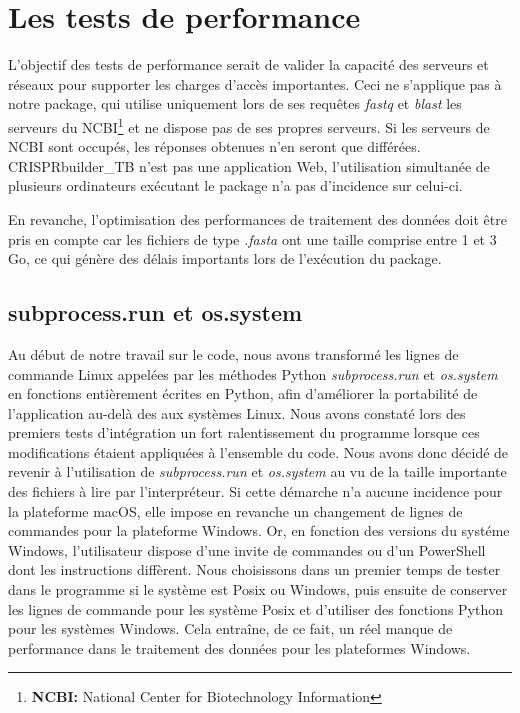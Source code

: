 \documentclass[twoside,a4paper,11pt,frenchb,openany]{report}
\begin{document}
\section{Les tests de performance}

L'objectif des tests de performance serait de valider la capacité des serveurs et réseaux pour supporter les charges d'accès importantes. Ceci ne s'applique pas à notre package, qui utilise uniquement lors de ses requêtes \textit{fastq} et \textit{blast} les serveurs du NCBI\footnote{\textbf{NCBI:} National Center for Biotechnology Information} et ne dispose pas de ses propres serveurs. Si les serveurs de NCBI sont occupés, les réponses obtenues n'en seront que différées. CRISPRbuilder\_TB n'est pas une application Web, l'utilisation simultanée de plusieurs ordinateurs exécutant le package n'a pas d'incidence sur celui-ci.

En revanche, l'optimisation des performances de traitement des données doit être pris en compte car les fichiers de type \textit{.fasta} ont une taille comprise entre 1 et 3 Go, ce qui génère des délais importants lors de l'exécution du package.



\subsection{subprocess.run et os.system}

Au début de notre travail sur le code, nous avons transformé les lignes de commande Linux appelées par les méthodes Python \textit{subprocess.run} et \textit{os.system} en fonctions entièrement écrites en Python, afin d'améliorer la portabilité de l'application au-delà des aux systèmes Linux. Nous avons constaté lors des premiers tests d'intégration un fort ralentissement du programme lorsque ces modifications étaient appliquées à l'ensemble du code. Nous avons donc décidé de revenir à l'utilisation de \textit{subprocess.run} et \textit{os.system} au vu de la taille importante des fichiers à lire par l'interpréteur. Si cette démarche n'a aucune incidence pour la plateforme macOS, elle impose en revanche un changement de lignes de commandes pour la plateforme Windows. Or, en fonction des versions du systéme Windows, l'utilisateur dispose d'une invite de commandes ou d'un PowerShell dont les instructions diffèrent. Nous choisissons dans un premier temps de tester dans le programme si le système est Posix ou Windows, puis ensuite de conserver les lignes de commande pour les système Posix et d'utiliser des fonctions Python pour les systèmes Windows. Cela entraîne, de ce fait, un réel manque de performance dans le traitement des données pour les plateformes Windows. 
\end{document}
